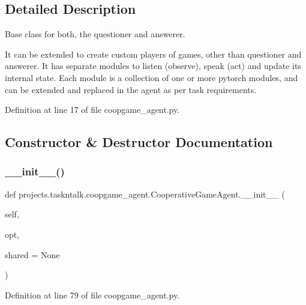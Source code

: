 \subsection{Detailed Description}
\begin{DoxyVerb}Base class for both, the questioner and answerer.

It can be extended to create custom players of games, other than questioner and
answerer. It has separate modules to listen (observe), speak (act) and update its
internal state. Each module is a collection of one or more pytorch modules, and can
be extended and replaced in the agent as per task requirements.
\end{DoxyVerb}
 

Definition at line 17 of file coopgame\+\_\+agent.\+py.



\subsection{Constructor \& Destructor Documentation}
\mbox{\label{classprojects_1_1taskntalk_1_1coopgame__agent_1_1CooperativeGameAgent_aee05007c3aa3127ebc9c6deff777c884}} 
\subsubsection{\texorpdfstring{\+\_\+\+\_\+init\+\_\+\+\_\+()}{\_\_init\_\_()}}
{\footnotesize\ttfamily def projects.\+taskntalk.\+coopgame\+\_\+agent.\+Cooperative\+Game\+Agent.\+\_\+\+\_\+init\+\_\+\+\_\+ (\begin{DoxyParamCaption}\item[{}]{self,  }\item[{}]{opt,  }\item[{}]{shared = {\ttfamily None} }\end{DoxyParamCaption})}



Definition at line 79 of file coopgame\+\_\+agent.\+py.


